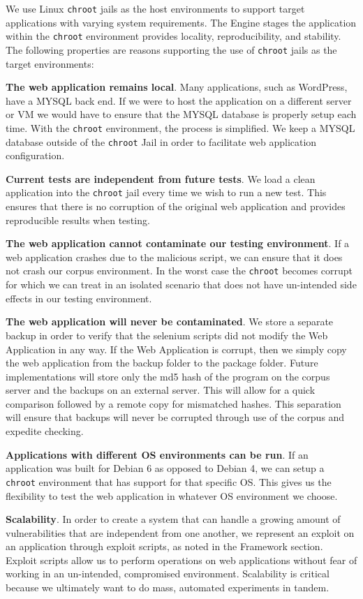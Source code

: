 \documentclass[letterpaper,twocolumn,10pt]{article}
\begin{document}
We use Linux {\tt chroot} jails as the host environments to support target applications with varying system requirements.  The Engine stages the application within the {\tt chroot} environment provides locality, reproducibility, and stability. The following properties are reasons supporting the use of {\tt chroot} jails as the target environments:\par
{\bf The web application remains local}.  Many applications, such as WordPress, have a MYSQL back end.  If we were to host the application on a different server or VM we would have to ensure that the MYSQL database is properly setup each time.  With the {\tt chroot} environment, the process is simplified. We keep a MYSQL database outside of the {\tt chroot} Jail in order to facilitate web application configuration. \par
{\bf Current tests are independent from future tests}.  We load a clean application into the {\tt chroot} jail every time we wish to run a new test.  This ensures that there is no corruption of the original web application and provides reproducible results when testing.\par
{\bf The web application cannot contaminate our testing environment}.  If a web application crashes due to the malicious script, we can ensure that it does not crash our corpus environment.  In the worst case the {\tt chroot} becomes corrupt for which we can treat in an isolated scenario that does not have un-intended side effects in our testing environment.\par
{\bf The web application will never be contaminated}.  We store a separate backup in order to verify that the selenium scripts did not modify the Web Application in any way.  If the Web Application is corrupt, then we simply copy the web application from the backup folder to the package folder.  Future implementations will store only the md5 hash of the program on the corpus server and the backups on an external server.  This will allow for a quick comparison followed by a remote copy for mismatched hashes.  This separation will ensure that backups will never be corrupted through use of the corpus and expedite checking.\par
{\bf Applications with different OS environments can be run}.  If an application was built for Debian 6 as opposed to Debian 4, we can setup a {\tt chroot} environment that has support for that specific OS.  This gives us the flexibility to test the web application in whatever OS environment we choose.\par
{\bf Scalability}.  In order to create a system that can handle a growing amount of vulnerabilities that are independent from one another, we represent an exploit on an application through exploit scripts, as noted in the Framework section.  Exploit scripts allow us to perform operations on web applications without fear of working in an un-intended, compromised environment.  Scalability is critical because we ultimately want to do mass, automated experiments in tandem. 
\end{document}
